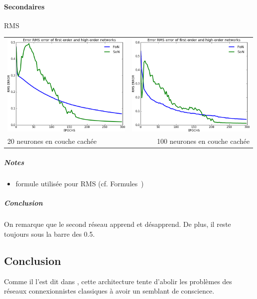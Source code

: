     \paragraph{Secondaires}
      RMS
      \begin{center}
	\begin{tabular}{lr}
	  \hspace*{-1cm}
	  \includegraphics[width=250px]{data/expC1/rms_20.png}
	  &
	  \includegraphics[width=250px]{data/expC1/rms_100.png} \\
	  
	  20 neurones en couche cachée
	  &
	  \hspace*{-1cm}
	  100 neurones en couche cachée
	\end{tabular}
      \end{center} 
      \subparagraph{Notes}
	\begin{itemize}
	  \item formule utilisée pour RMS (cf. Formules~)
	\end{itemize}
      \subparagraph{Conclusion}
	On remarque que le second réseau apprend et désapprend. De plus, il reste toujours sous la barre
	des 0.5.

  \subsection{Conclusion}
    Comme il l'est dit dans \cite{Cleeremans_2007}, cette architecture tente d'abolir les problèmes des réseaux connexionnistes
  classiques à avoir un semblant de conscience.
  
